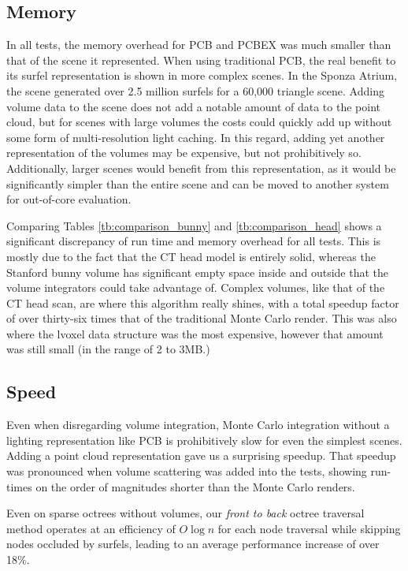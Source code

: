 \documentclass[12pt]{ucthesis}
\begin{document}
\subsection{Memory}
In all tests, the memory overhead for PCB and PCBEX was much smaller than that of the scene it represented.  When using traditional PCB, the real benefit to its surfel representation is shown in more complex scenes.  In the Sponza Atrium, the scene generated over 2.5 million surfels for a 60,000 triangle scene.  Adding volume data to the scene does not add a notable amount of data to the point cloud, but for scenes with large volumes the costs could quickly add up without some form of multi-resolution light caching.  In this regard, adding yet another representation of the volumes may be expensive, but not prohibitively so.  Additionally, larger scenes would benefit from this representation, as it would be significantly simpler than the entire scene and can be moved to another system for out-of-core evaluation.

Comparing Tables \ref{tb:comparison_bunny} and \ref{tb:comparison_head} shows a significant discrepancy of run time and memory overhead for all tests.  This is mostly due to the fact that the CT head model is entirely solid, whereas the Stanford bunny volume has significant empty space inside and outside that the volume integrators could take advantage of.  Complex volumes, like that of the CT head scan, are where this algorithm really shines, with a total speedup factor of over thirty-six times that of the traditional Monte Carlo render.  This was also where the lvoxel data structure was the most expensive, however that amount was still small (in the range of 2 to 3MB.)

\subsection{Speed}
Even when disregarding volume integration, Monte Carlo integration without a lighting representation like PCB is prohibitively slow for even the simplest scenes.  Adding a point cloud representation gave us a surprising speedup.  That speedup was pronounced when volume scattering was added into the tests, showing run-times on the order of magnitudes shorter than the Monte Carlo renders.

Even on sparse octrees without volumes, our \textit{front to back} octree traversal method operates at an efficiency of $O\log{n}$ for each node traversal while skipping nodes occluded by surfels, leading to an average performance increase of over 18\%.
\end{document}
